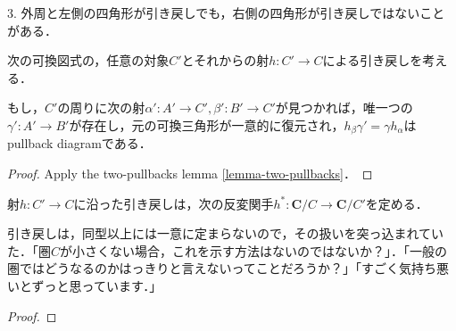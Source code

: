 \documentclass[uplatex, 12pt, dvipdfmx]{jsarticle}
\begin{document}
\begin{lemma*}
    3. 外周と左側の四角形が引き戻しでも，右側の四角形が引き戻しではないことがある．
\end{lemma*}

\begin{corollary}[可換三角形の引き戻しは可換三角形である．]
    次の可換図式の，任意の対象$C'$とそれからの射$h:C'\to C$による引き戻しを考える．
    \begin{center}
    \end{center}
    もし，$C'$の周りに次の射$\alpha':A'\to C',\beta':B'\to C'$が見つかれば，唯一つの$\gamma':A'\to B'$が存在し，元の可換三角形が一意的に復元され，$h_\beta\gamma'=\gamma h_\alpha$はpullback diagramである．
    \begin{center}
    \end{center}
\end{corollary}
\begin{proof}
    Apply the two-pullbacks lemma \ref{lemma-two-pullbacks}．
\end{proof}

\begin{proposition}\label{prop-pullback-functor}
    射$h:C'\to C$に沿った引き戻しは，次の反変関手$h^*:\mathbf{C}/C\to\mathbf{C}/C'$を定める．
    \begin{center}
    \end{center}
\end{proposition}
\begin{remark*}
    引き戻しは，同型以上には一意に定まらないので，その扱いを突っ込まれていた．「圏$C$が小さくない場合，これを示す方法はないのではないか？」．「一般の圏ではどうなるのかはっきりと言えないってことだろうか？」「すごく気持ち悪いとずっと思っています．」
\end{remark*}
\begin{proof}
    
\end{proof}
\end{document}
